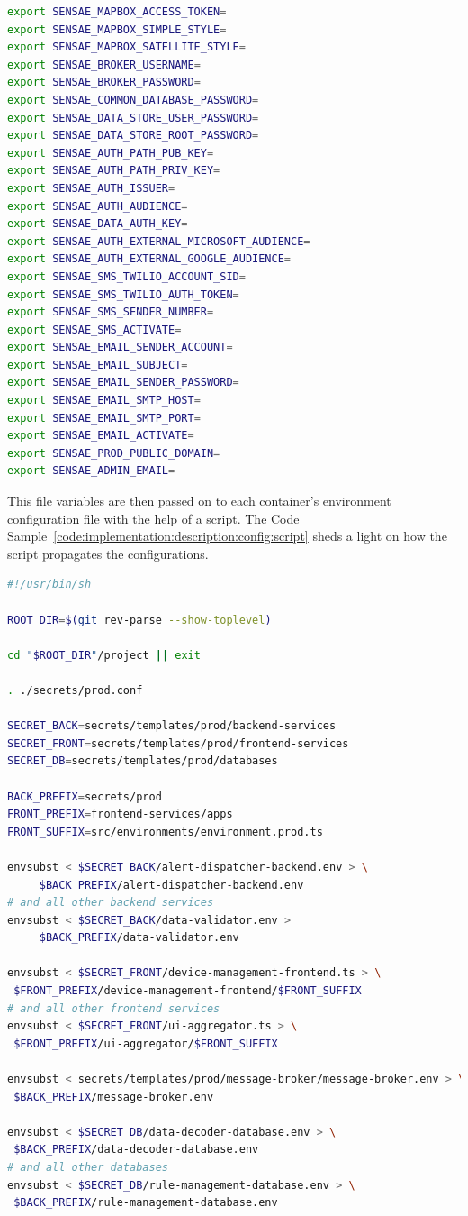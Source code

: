 \begin{lstlisting}[language=bash, style=bash, caption=Configuration File for Production Environment, label={code:implementation:description:config:file}]
export SENSAE_MAPBOX_ACCESS_TOKEN=
export SENSAE_MAPBOX_SIMPLE_STYLE=
export SENSAE_MAPBOX_SATELLITE_STYLE=
export SENSAE_BROKER_USERNAME=
export SENSAE_BROKER_PASSWORD=
export SENSAE_COMMON_DATABASE_PASSWORD=
export SENSAE_DATA_STORE_USER_PASSWORD=
export SENSAE_DATA_STORE_ROOT_PASSWORD=
export SENSAE_AUTH_PATH_PUB_KEY=
export SENSAE_AUTH_PATH_PRIV_KEY=
export SENSAE_AUTH_ISSUER=
export SENSAE_AUTH_AUDIENCE=
export SENSAE_DATA_AUTH_KEY=
export SENSAE_AUTH_EXTERNAL_MICROSOFT_AUDIENCE=
export SENSAE_AUTH_EXTERNAL_GOOGLE_AUDIENCE=
export SENSAE_SMS_TWILIO_ACCOUNT_SID=
export SENSAE_SMS_TWILIO_AUTH_TOKEN=
export SENSAE_SMS_SENDER_NUMBER=
export SENSAE_SMS_ACTIVATE=
export SENSAE_EMAIL_SENDER_ACCOUNT=
export SENSAE_EMAIL_SUBJECT=
export SENSAE_EMAIL_SENDER_PASSWORD=
export SENSAE_EMAIL_SMTP_HOST=
export SENSAE_EMAIL_SMTP_PORT=
export SENSAE_EMAIL_ACTIVATE=
export SENSAE_PROD_PUBLIC_DOMAIN=
export SENSAE_ADMIN_EMAIL=
\end{lstlisting}

This file variables are then passed on to each container's environment configuration file with the help of a script. The Code Sample~\ref{code:implementation:description:config:script} sheds a light on how the script propagates the configurations.

\begin{lstlisting}[language=bash, style=bash, caption=Configuration Propagation Script, label={code:implementation:description:config:script}]
#!/usr/bin/sh

ROOT_DIR=$(git rev-parse --show-toplevel)

cd "$ROOT_DIR"/project || exit

. ./secrets/prod.conf

SECRET_BACK=secrets/templates/prod/backend-services
SECRET_FRONT=secrets/templates/prod/frontend-services
SECRET_DB=secrets/templates/prod/databases

BACK_PREFIX=secrets/prod
FRONT_PREFIX=frontend-services/apps
FRONT_SUFFIX=src/environments/environment.prod.ts

envsubst < $SECRET_BACK/alert-dispatcher-backend.env > \
     $BACK_PREFIX/alert-dispatcher-backend.env
# and all other backend services
envsubst < $SECRET_BACK/data-validator.env >
     $BACK_PREFIX/data-validator.env

envsubst < $SECRET_FRONT/device-management-frontend.ts > \
 $FRONT_PREFIX/device-management-frontend/$FRONT_SUFFIX
# and all other frontend services
envsubst < $SECRET_FRONT/ui-aggregator.ts > \
 $FRONT_PREFIX/ui-aggregator/$FRONT_SUFFIX

envsubst < secrets/templates/prod/message-broker/message-broker.env > \
 $BACK_PREFIX/message-broker.env

envsubst < $SECRET_DB/data-decoder-database.env > \
 $BACK_PREFIX/data-decoder-database.env
# and all other databases
envsubst < $SECRET_DB/rule-management-database.env > \
 $BACK_PREFIX/rule-management-database.env
\end{lstlisting}

